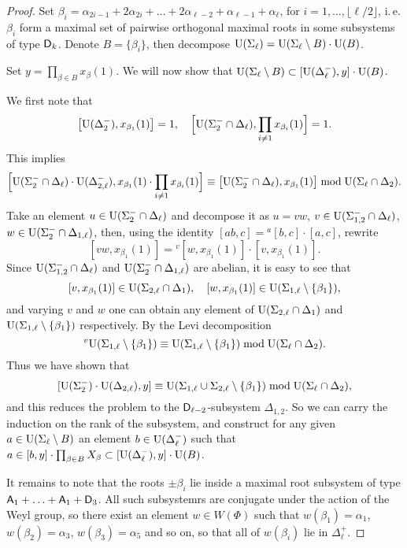 \begin{proof}
Set $\beta_i = \alpha_{2i-1} + 2\alpha_{2i}+ \ldots + 2\alpha_{\ell-2} + \alpha_{\ell-1} + \alpha_\ell$, for $i=1,\ldots,\lfloor\ell/2\rfloor$, i.\,e. $\beta_i$ form a maximal set of pairwise orthogonal maximal roots in some subsystems of type $\mathsf{D}_{k}$. Denote $B=\{\beta_i\}$, then decompose $\operatorname{U}(\Sigma_\ell)=\operatorname{U}(\Sigma_\ell\setminus B)\cdot\operatorname{U}(B)$.

Set $y=\prod_{\beta\in B}x_\beta(1)$. We will now show that $\operatorname{U}(\Sigma_\ell\setminus B)\subset[\operatorname{U}(\Delta_\ell^-),y]\cdot\operatorname{U}(B)$.

We first note that
\[ \bigl[\operatorname{U}(\Delta_2^-),x_{\beta_1}(1)\bigr]=1,\quad \Bigl[\operatorname{U}(\Sigma_2^-\cap\Delta_\ell),\prod_{i\neq1}x_{\beta_i}(1)\Bigr]=1. \]
This implies
\[ \Bigl[ \operatorname{U}(\Sigma_2^-\cap\Delta_\ell)\cdot\operatorname{U}(\Delta_{2,\ell}^-), x_{\beta_1}(1)\cdot\prod_{i\neq1}x_{\beta_i}(1) \Bigr] \equiv \bigl[ \operatorname{U}(\Sigma_2^-\cap\Delta_\ell), x_{\beta_1}(1) \bigr] \bmod \operatorname{U}(\Sigma_\ell\cap\Delta_2). \]
Take an element $u\in\operatorname{U}(\Sigma_2^-\cap\Delta_\ell)$ and decompose it as $u=vw$, $v\in\operatorname{U}(\Sigma_{1,2}^-\cap\Delta_\ell)$, $w\in\operatorname{U}(\Sigma_2^-\cap\Delta_{1,\ell})$, then, using the identity $[ab,c]={}^a[b,c]\cdot[a,c]$, rewrite
\[ [vw,x_{\beta_1}(1)] = {}^v[w,x_{\beta_1}(1)]\cdot[v,x_{\beta_1}(1)].  \]
Since $\operatorname{U}(\Sigma_{1,2}^-\cap\Delta_\ell)$ and $\operatorname{U}(\Sigma_2^-\cap\Delta_{1,\ell})$ are abelian, it is easy to see that
\[ [v,x_{\beta_1}(1)]\in\operatorname{U}(\Sigma_{2,\ell}\cap\Delta_1), \quad [w,x_{\beta_1}(1)]\in\operatorname{U}(\Sigma_{1,\ell}\setminus\{\beta_1\}), \]
and varying $v$ and $w$ one can obtain any element of $\operatorname{U}(\Sigma_{2,\ell}\cap\Delta_1)$ and $\operatorname{U}(\Sigma_{1,\ell}\setminus\{\beta_1\})$ respectively. By the Levi decomposition
\[ {}^v\!\operatorname{U}(\Sigma_{1,\ell}\setminus\{\beta_1\}) \equiv \operatorname{U}(\Sigma_{1,\ell}\setminus\{\beta_1\}) \bmod \operatorname{U}(\Sigma_\ell\cap\Delta_2). \]
Thus we have shown that
\[ [\operatorname{U}(\Sigma_2^-)\cdot\operatorname{U}(\Delta_{2,\ell}),y] \equiv \operatorname{U}(\Sigma_{1,\ell}\cup\Sigma_{2,\ell}\setminus\{\beta_1\}) \bmod \operatorname{U}(\Sigma_\ell\cap\Delta_2), \]
and this reduces the problem to the $\mathsf{D}_{\ell-2}$-subsystem $\Delta_{1,2}$. So we can carry the induction on the rank of the subsystem, and construct for any given $a\in\operatorname{U}(\Sigma_\ell\setminus B)$ an element $b\in\operatorname{U}(\Delta_\ell^-)$ such that $a\in[b,y]\cdot\prod_{\beta\in B}X_\beta\subset[\operatorname{U}(\Delta_\ell^-),y]\cdot\operatorname{U}(B)$.

It remains to note that the roots $\pm\beta_i$ lie inside a maximal root subsystem of type $\mathsf{A}_1+\ldots+\mathsf{A}_1+\mathsf{D}_3$. All such subsystemrs are conjugate under the action of the Weyl group, so there exist an element $w\in W(\Phi)$ such that $w(\beta_1)=\alpha_1$, $w(\beta_2)=\alpha_3$, $w(\beta_3)=\alpha_5$ and so on, so that all of $w(\beta_i)$ lie in $\Delta_\ell^+$.
\end{proof}
